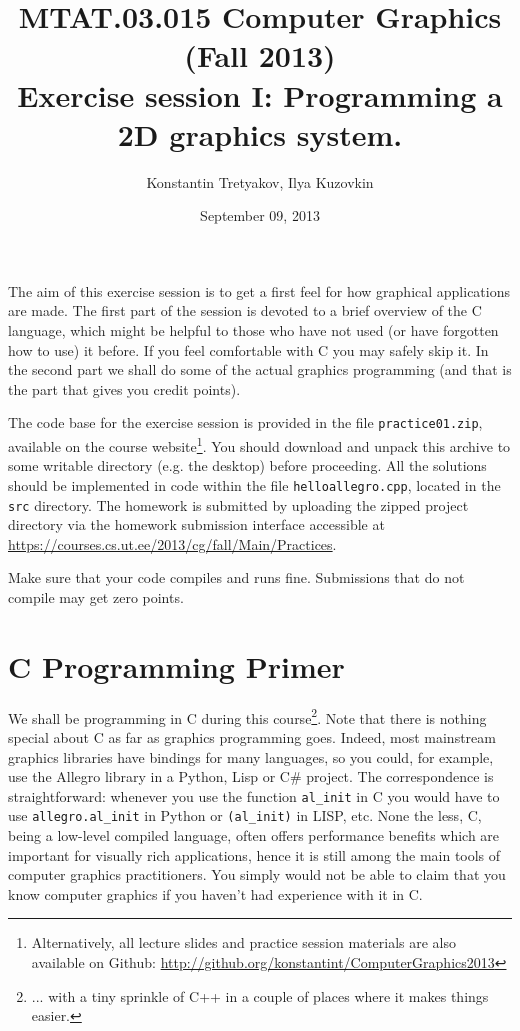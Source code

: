 \documentclass{article}
\begin{document}
\title{MTAT.03.015 Computer Graphics (Fall 2013)\\
Exercise session I: Programming a 2D graphics system.}
\author{Konstantin Tretyakov, Ilya Kuzovkin}
\date{September 09, 2013}
\maketitle

The aim of this exercise session is to get a first feel for how graphical applications are made. The first part of the session is devoted to a brief overview of the C language, which might be helpful to those who have not used (or have forgotten how to use) it before. If you feel comfortable with C you may safely skip it. In the second part we shall do some of the actual graphics programming (and that is the part that gives you credit points).

The code base for the exercise session is provided in the file \texttt{practice01.zip}, available on the course website\footnote{Alternatively, all lecture slides and practice session materials are also available on Github: \url{http://github.org/konstantint/ComputerGraphics2013}}. You should download and unpack this archive to some writable directory (e.g. the desktop) before proceeding. All the solutions should be implemented in code within the file \texttt{helloallegro.cpp}, located in the \texttt{src} directory. The homework is submitted by uploading the zipped project directory via the homework submission interface accessible at \url{https://courses.cs.ut.ee/2013/cg/fall/Main/Practices}.

Make sure that your code compiles and runs fine. Submissions that do not compile may get zero points.


\section{C Programming Primer}

We shall be programming in C during this course\footnote{... with a tiny sprinkle of C++ in a couple of places where it makes things easier.}. Note that there is nothing special about C as far as graphics programming goes. Indeed, most mainstream graphics libraries have bindings for many languages, so you could, for example, use the Allegro library in a Python, Lisp or C\# project. The correspondence is straightforward: whenever you use the function \verb#al_init# in C you would have to use \verb#allegro.al_init# in Python or \verb#(al_init)# in LISP, etc. None the less, C, being a low-level compiled language, often offers performance benefits which are important for visually rich applications, hence it is still among the main tools of computer graphics practitioners. You simply would not be able to claim that you know computer graphics if you haven't had experience with it in C.
\end{document}
